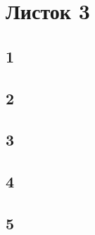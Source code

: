 \newpage
	\section{Листок 3}
		\subsection{1}
		\subsection{2}
		\subsection{3}
		\subsection{4}
		\subsection{5}